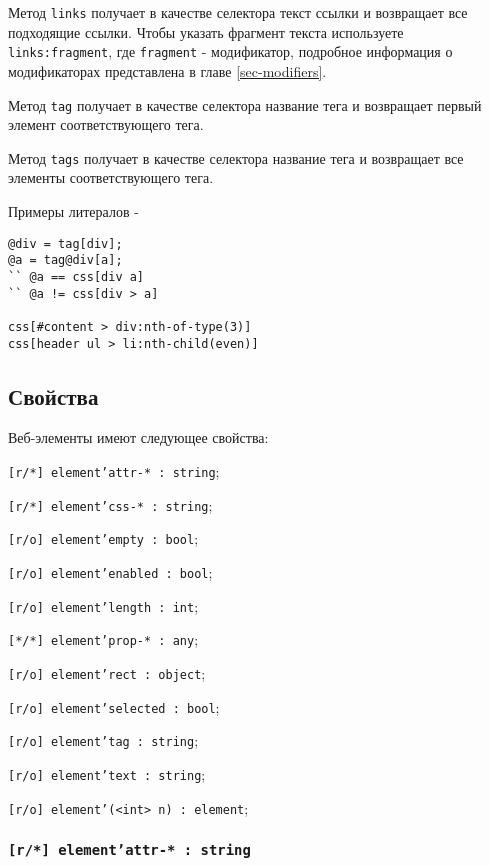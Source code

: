 Метод \texttt{links} получает в качестве селектора текст ссылки и возвращает все подходящие ссылки. Чтобы указать фрагмент текста используете \texttt{links:fragment}, где \texttt{fragment} - модификатор, подробное информация о модификаторах представлена в главе \ref{sec-modifiers}.

Метод \texttt{tag} получает в качестве селектора название тега и возвращает первый элемент соответствующего тега.

Метод \texttt{tags} получает в качестве селектора название тега и возвращает все элементы соответствующего тега.

Примеры литералов -
\begin{verbatim}
@div = tag[div];
@a = tag@div[a];
`` @a == css[div a]
`` @a != css[div > a]

css[#content > div:nth-of-type(3)]
css[header ul > li:nth-child(even)]
\end{verbatim}

\subsection{Свойства}

Веб-элементы имеют следующее свойства:
\begin{icItems}
\item \texttt{[r/*] element'attr-* : string};
\item \texttt{[r/*] element'css-* : string};
\item \texttt{[r/o] element'empty : bool};
\item \texttt{[r/o] element'enabled : bool};
\item \texttt{[r/o] element'length : int};
\item \texttt{[*/*] element'prop-* : any};
\item \texttt{[r/o] element'rect : object};
\item \texttt{[r/o] element'selected : bool};
\item \texttt{[r/o] element'tag : string};
\item \texttt{[r/o] element'text : string};
\item \texttt{[r/o] element'(<int> n) : element};
\end{icItems} 

\subsubsection{\texttt{[r/*] element'attr-* : string}}

